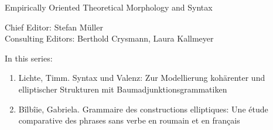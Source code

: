 {\large Em­pir­i­cal­ly Ori­ent­ed The­o­ret­i­cal Mor­phol­o­gy and Syn­tax}

\bigskip

Chief Editor: Stefan Müller  \\
Consulting Editors: Berthold Crysmann, Laura Kallmeyer

\bigskip

In this series:

\begin{enumerate}
\item Lichte, Timm. Syntax und Valenz: Zur Modellierung kohärenter und elliptischer Strukturen mit Baumadjunktionsgrammatiken
\item  Bîlbîie, Gabriela. Grammaire des constructions elliptiques: Une étude comparative des phrases sans verbe en roumain et en français 
\end{enumerate}



